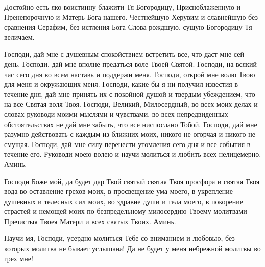 Достойно есть яко воистинну блажити Тя Богородицу, Присноблаженную и Пренепорочную и Матерь Бога нашего. Честнейшую Херувим и славнейшую без сравнения Серафим, без истления Бога Слова рождшую, сущую Богородицу Тя величаем.
\nopagebreak\bigskip\bigskip\mychapterending

 


Господи, дай мне с душевным спокойствием встретить все, что даст мне сей день. Господи, дай мне вполне предаться воле Твоей Святой. Господи, на всякий час сего дня во всем наставь и поддержи меня. Господи, открой мне волю Твою для меня и окружающих меня. Господи, какие бы я ни получил известия в течение дня, дай мне принять их с покойной душой и твердым убеждением, что на все Святая воля Твоя. Господи, Великий, Милосердный, во всех моих делах и словах руководи моими мыслями и чувствами, во всех непредвиденных обстоятельствах не дай мне забыть, что все ниспослано Тобой. Господи, дай мне разумно действовать с каждым из ближних моих, никого не огорчая и никого не смущая. Господи, дай мне силу перенести утомления сего дня и все события в течение его. Руководи моею волею и научи молиться и любить всех нелицемерно. Аминь.
\nopagebreak\bigskip\bigskip\mychapterending

 


Господи Боже мой, да будет дар Твой святый святая Твоя просфора и святая Твоя вода во оставление грехов моих, в просвещение ума моего, в укрепление душевных и телесных сил моих, во здравие души и тела моего, в покорение страстей и немощей моих по безпредельному милосердию Твоему молитвами Пречистыя Твоея Матери и всех святых Твоих. Аминь.


\bigskip\mychapterending

 



Научи мя, Господи, усердно молиться Тебе со вниманием и любовью, без которых молитва не бывает услышана! Да не будет у меня небрежной молитвы во грех мне!
\nopagebreak\bigskip\bigskip\mychapterending

 




